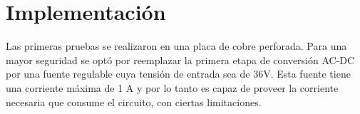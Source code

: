 \section{Implementación}

Las primeras pruebas se realizaron en una placa de cobre perforada. 
Para una mayor seguridad se optó por reemplazar la primera etapa de conversión AC-DC por una fuente regulable cuya tensión de entrada sea de 36V.
Esta fuente tiene una corriente máxima de 1 A y por lo tanto es capaz de proveer la corriente necesaria que consume el circuito, con ciertas limitaciones.